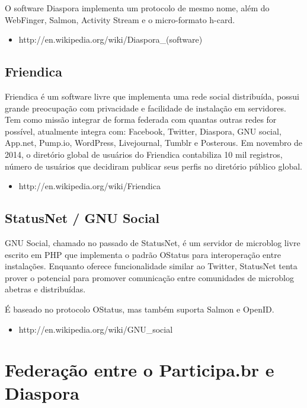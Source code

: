 \documentclass[12pt]{article}
\begin{document}
O software Diaspora implementa um protocolo de mesmo nome, além do WebFinger,
Salmon, Activity Stream e o micro-formato h-card.

\begin{itemize}
  \item http://en.wikipedia.org/wiki/Diaspora\_(software)
\end{itemize}

\subsection{Friendica}

Friendica é um software livre que implementa uma rede social distribuída,
possui grande preocupação com privacidade e facilidade de instalação em
servidores. Tem como missão integrar de forma federada com quantas outras
redes for possível, atualmente integra com:  Facebook, Twitter, Diaspora, GNU
social, App.net, Pump.io, WordPress, Livejournal, Tumblr e Posterous. Em
novembro de 2014, o diretório global de usuários do Friendica contabiliza 10
mil registros, número de usuários que decidiram publicar seus perfis no
diretório público global.

\begin{itemize}
  \item http://en.wikipedia.org/wiki/Friendica
\end{itemize}

\subsection{StatusNet / GNU Social}

GNU Social, chamado no passado de StatusNet, é um servidor de microblog livre
escrito em PHP que implementa o padrão OStatus para interoperação entre
instalações. Enquanto oferece funcionalidade similar ao Twitter, StatusNet
tenta prover o potencial para promover comunicação entre comunidades de
microblog abetras e distribuídas.

É baseado no protocolo OStatus, mas também suporta Salmon e OpenID.

\begin{itemize}
  \item http://en.wikipedia.org/wiki/GNU\_social
\end{itemize}

\section{Federação entre o Participa.br e Diaspora}
\end{document}
